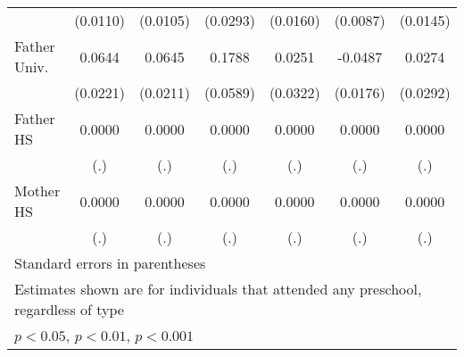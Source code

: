 \begin{table}[htbp]
\begin{tabular}{l*{6}{c}}
            &    (0.0110)         &    (0.0105)         &    (0.0293)         &    (0.0160)         &    (0.0087)         &    (0.0145)         \\
\addlinespace
Father Univ.&      0.0644\sym{**} &      0.0645\sym{**} &      0.1788\sym{**} &      0.0251         &     -0.0487\sym{**} &      0.0274         \\
            &    (0.0221)         &    (0.0211)         &    (0.0589)         &    (0.0322)         &    (0.0176)         &    (0.0292)         \\
\addlinespace
Father HS   &      0.0000         &      0.0000         &      0.0000         &      0.0000         &      0.0000         &      0.0000         \\
            &         (.)         &         (.)         &         (.)         &         (.)         &         (.)         &         (.)         \\
\addlinespace
Mother HS   &      0.0000         &      0.0000         &      0.0000         &      0.0000         &      0.0000         &      0.0000         \\
            &         (.)         &         (.)         &         (.)         &         (.)         &         (.)         &         (.)         \\
\bottomrule
\multicolumn{7}{l}{\footnotesize Standard errors in parentheses}\\
\multicolumn{7}{l}{\footnotesize Estimates shown are for individuals that attended any preschool, regardless of type}\\
\multicolumn{7}{l}{\footnotesize \sym{*} \(p<0.05\), \sym{**} \(p<0.01\), \sym{***} \(p<0.001\)}\\
\end{tabular}
\end{table}
